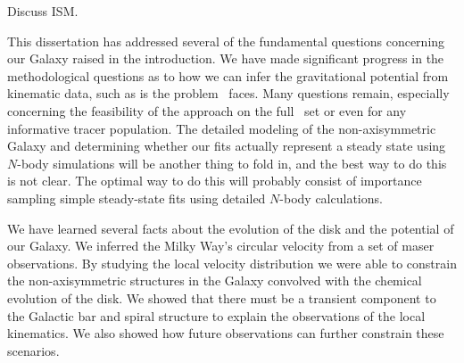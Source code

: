 Discuss ISM. 

This dissertation has addressed several of the fundamental questions
concerning our Galaxy raised in the introduction. We have made
significant progress in the methodological questions as to how we can
infer the gravitational potential from kinematic data, such as is the
problem \Gaia\ faces. Many questions remain, especially concerning the
feasibility of the approach on the full \Gaia\ set or even for any
informative tracer population. The detailed modeling of the
non-axisymmetric Galaxy and determining whether our fits actually
represent a steady state using $N$-body simulations will be another
thing to fold in, and the best way to do this is not clear. The
optimal way to do this will probably consist of importance sampling
simple steady-state fits using detailed $N$-body calculations.

We have learned several facts about the evolution of the disk and the
potential of our Galaxy. We inferred the Milky Way's circular velocity
from a set of maser observations. By studying the local velocity
distribution we were able to constrain the non-axisymmetric structures
in the Galaxy convolved with the chemical evolution of the disk. We
showed that there must be a transient component to the Galactic bar
and spiral structure to explain the observations of the local
kinematics. We also showed how future observations can further
constrain these scenarios.
